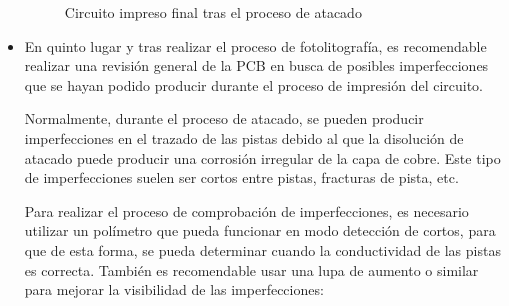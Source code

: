 \begin{itemize}
    \begin{figure}[H]
    \centering
    \caption{Circuito impreso final tras el proceso de atacado}
    \label{fig:lego}
    \end{figure}
    
    \item En quinto lugar y tras realizar el proceso de fotolitografía, es recomendable realizar una revisión general de la \ac{PCB} en busca de posibles imperfecciones que se hayan podido producir durante el proceso de impresión del circuito.
    
    Normalmente, durante el proceso de atacado, se pueden producir imperfecciones en el trazado de las pistas debido al que la disolución de atacado puede producir una corrosión irregular de la capa de cobre. Este tipo de imperfecciones suelen ser cortos entre pistas, fracturas de pista, etc.
    
    Para realizar el proceso de comprobación de imperfecciones, es necesario utilizar un polímetro que pueda funcionar en modo detección de cortos, para que de esta forma, se pueda determinar cuando la conductividad de las pistas es correcta. También es recomendable usar una lupa de aumento o similar para mejorar la visibilidad de las imperfecciones:
    

\end{itemize}
